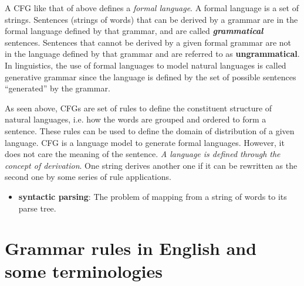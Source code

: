 \documentclass[11pt]{article}
\begin{document}
A CFG like that of above defines a \emph{formal language}. A formal language is a set of strings. Sentences (strings of words) that can be derived by a
grammar are in the formal language defined by that grammar, and are called \emph{\textbf{grammatical}} sentences. Sentences that cannot be derived by a given formal grammar are not in the language defined by that grammar and are referred to as \textbf{ungrammatical}. In linguistics, the use of formal languages to model natural languages is called generative grammar since the language is defined by the set of possible sentences “generated” by the grammar. 

As seen above, CFGs are set of rules to define the constituent structure of natural languages, i.e. how the words are grouped and ordered to form a sentence. These rules can be used to define the domain of distribution of a given language.  CFG is a language model to generate formal languages. However, it does not care the meaning of the sentence. \emph{A language is defined through the concept of derivation}. One string derives another one if it can be rewritten as the second one by some series of rule applications.

\begin{itemize}
\item \textbf{syntactic parsing}: The problem of mapping from a string of words to its parse tree. 
\end{itemize}

\section{Grammar rules in English and some terminologies}
\end{document}
